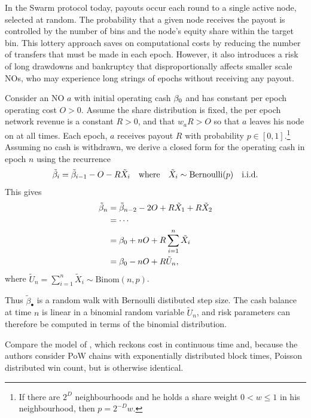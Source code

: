 In the Swarm protocol today, payouts occur each round to a single active node, selected at random.
%
The probability that a given node receives the payout is controlled by the number of bins and the node's equity share within the target bin.
%
This lottery approach saves on computational costs by reducing the number of transfers that must be made in each epoch.
%
However, it also introduces a risk of long drawdowns and bankruptcy that disproportionally affects smaller scale NOs, who may experience long strings of epochs without receiving any payout.

Consider an NO $a$ with initial operating cash $\beta_0$ and has constant per epoch operating cost $O>0$.
%
Assume the share distribution is fixed, the per epoch network revenue is a constant $R>0$, and that $w_aR>O$ so that $a$ leaves his node on at all times.
%
Each epoch, $a$ receives payout $R$ with probability $p\in[0,1]$.\footnote{If there are $2^D$ neighbourhoods and he holds a share weight $0<w\leq 1$ in his neighbourhood, then $p=2^{-D}w$.}
%
Assuming no cash is withdrawn, we derive a closed form for the operating cash in epoch $n$ using the recurrence
%
\[
  \tilde{\beta}_i = \tilde {\beta}_{i-1} - O - R\tilde{X}_i \quad \text{where} \quad \tilde{X}_i \sim \mathrm{Bernoulli}(p) \quad \text{i.i.d.}
\]
%
This gives 
\begin{align*}
  \tilde {\beta}_n &= \tilde {\beta}_{n-2} - 2O + R\tilde X_1 + R\tilde X_2 \\
  & =\cdots \\
  &= \beta_0 + nO + R\sum_{i=1}^n \tilde X_i \\
  &= \beta_0 - nO + R\tilde U_n,
\end{align*}
where $\tilde U_n = \sum_{i=1}^n \tilde X_i \sim \mathrm{Binom}(n,p)$.

Thus $\tilde{\beta}_\bullet$ is a random walk with Bernoulli distibuted step size.
%
The cash balance at time $n$ is linear in a binomial random variable $\tilde U_n$, and risk parameters can therefore be computed in terms of the binomial distribution.

\begin{remark}

  Compare the model of \cite[\S2]{hansjoerg2022profitability}, which reckons cost in continuous time and, because the authors consider PoW chains with exponentially distributed block times, Poisson distributed win count, but is otherwise identical.

\end{remark}

